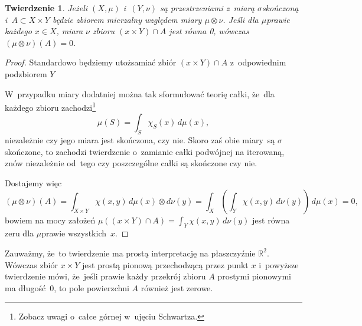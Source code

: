 \documentclass[a4paper,11pt]{article}
\newtheorem{twr}{Twierdzenie} %
\newcommand{\spaceFour}{0.5em}
\newcommand{\mb}{\mathbb}
\newcommand{\si}{\sigma}
\newcommand{\R}{\mb{R}}
\newcommand{\subs}{\subset}
\newcommand{\ti}{\times}
\newcommand{\ot}{\otimes}
\begin{document}
\begin{twr}
  \label{twr:miaraA}
  Jeżeli $( X, \mu )$ i~$( Y, \nu )$ są przestrzeniami z~miarą
  $\si$\dywiz skończoną i~$A \subs X \ti Y$ będzie zbiorem mierzalny
  względem miary $\mu \ot \nu$. Jeśli dla $\mu$\dywiz prawie każdego
  $x \in X$, miara $\nu$ zbioru $( x \ti Y ) \cap A$ jest równa 0,
  wówczas $(\mu \ot \nu)( A ) = 0$.
\end{twr}
\begin{proof}
  Standardowo będziemy utożsamiać zbiór $( x \ti Y ) \cap A$
  z~odpowiednim podzbiorem $Y$

  W~przypadku miary dodatniej można tak sformułować teorię całki,
  że~dla każdego zbioru zachodzi\footnote{Zobacz uwagi o~całce górnej
    w~ujęciu Schwartza.}
  \begin{equation*}
    \mu( S ) = \int_{ S } \chi_{ S }( x ) \, d\mu( x ),
  \end{equation*}
  niezależnie czy jego miara jest skończona, czy nie. Skoro zaś obie
  miary~są $\si$\dywiz skończone, to zachodzi twierdzenie o~zamianie
  całki podwójnej na iterowaną, znów niezależnie od~tego czy
  poszczególne całki są skończone czy nie.

  Dostajemy więc
  \begin{equation*}
    (\mu \ot \nu)( A ) = \int_{ X \ti Y } \chi( x, y )
    \, d\mu( x ) \ot d\nu( y )
    = \int_{ X } \left( \int_{ Y } \chi( x, y ) \, d\nu( y ) \right)
    \, d\mu( x ) = 0,
  \end{equation*}
  bowiem na mocy założeń
  $\mu( ( x \ti Y ) \cap A ) = \int_{ Y } \chi( x, y ) \, d\nu( y )$
  jest równa zeru dla $\mu$\dywiz prawie wszystkich~$x$.
\end{proof}
Zauważmy, że~to twierdzenie ma prostą interpretację na płaszczyźnie
$\R^{ 2 }$. Wówczas zbiór $x \ti Y$ jest prostą pionową przechodzącą
przez punkt $x$ i~powyższe twierdzenie mówi, że~jeśli prawie każdy
przekrój zbioru $A$ prostymi pionowymi ma długość~0, to pole
powierzchni $A$ również jest zerowe.

\vspace{\spaceFour}
\end{document}
